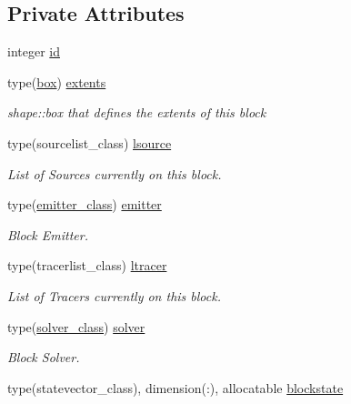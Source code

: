 \subsection*{Private Attributes}
\begin{DoxyCompactItemize}
\item 
integer \mbox{\hyperlink{structblocks__mod_1_1block__class_addd1a493d56aa1ffd1bc27c56b682065}{id}}
\item 
type(\mbox{\hyperlink{structgeometry__mod_1_1box}{box}}) \mbox{\hyperlink{structblocks__mod_1_1block__class_aff3b0cb7d8248f8a87691a028de916d3}{extents}}
\begin{DoxyCompactList}\small\item\em shape\+::box that defines the extents of this block \end{DoxyCompactList}\item 
type(sourcelist\+\_\+class) \mbox{\hyperlink{structblocks__mod_1_1block__class_a2f4d63afb2696e2728f20a99e26a4b18}{lsource}}
\begin{DoxyCompactList}\small\item\em List of Sources currently on this block. \end{DoxyCompactList}\item 
type(\mbox{\hyperlink{structemitter__mod_1_1emitter__class}{emitter\+\_\+class}}) \mbox{\hyperlink{structblocks__mod_1_1block__class_a55e85183ba871abcaba1c00d5393611f}{emitter}}
\begin{DoxyCompactList}\small\item\em Block Emitter. \end{DoxyCompactList}\item 
type(tracerlist\+\_\+class) \mbox{\hyperlink{structblocks__mod_1_1block__class_ab4e2108886a09ba919d01474503f6165}{ltracer}}
\begin{DoxyCompactList}\small\item\em List of Tracers currently on this block. \end{DoxyCompactList}\item 
type(\mbox{\hyperlink{structsolver__mod_1_1solver__class}{solver\+\_\+class}}) \mbox{\hyperlink{structblocks__mod_1_1block__class_a081258113128b3bcdefdbeac4bc5d039}{solver}}
\begin{DoxyCompactList}\small\item\em Block Solver. \end{DoxyCompactList}\item 
type(statevector\+\_\+class), dimension(\+:), allocatable \mbox{\hyperlink{structblocks__mod_1_1block__class_aadfea105067472c254ff6b9d0ae9e723}{blockstate}}

\end{DoxyCompactItemize}
